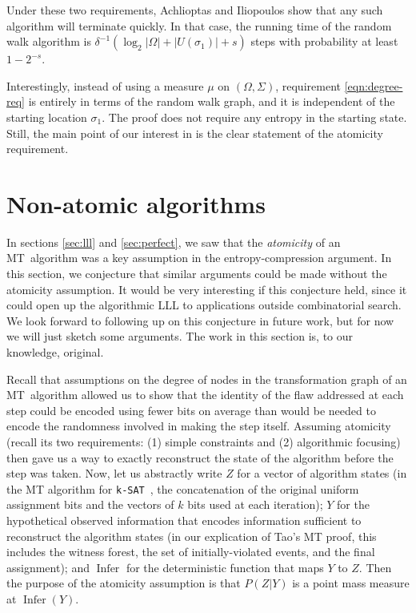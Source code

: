 \documentclass[twocolumn]{article}
\newcommand{\ksat}{\texttt{k-SAT}~}
\newcommand{\mt}{MT~}
\begin{document}
Under these two requirements, Achlioptas and Iliopoulos show that any such algorithm will terminate quickly.  In that case, the running time of the random walk algorithm is $\delta^{-1} (\log_2 |\Omega| + |U(\sigma_1)| + s)$ steps with probability at least $1 - 2^{-s}$.

Interestingly, instead of using a measure $\mu$ on $(\Omega, \Sigma)$, requirement \ref{eqn:degree-req} is entirely in terms of the random walk graph, and it is independent of the starting location $\sigma_1$.  The proof does not require any entropy in the starting state.  Still, the main point of our interest in \cite{achlioptas2014random} is the clear statement of the atomicity requirement.

\section{Non-atomic algorithms}
\label{sec:nonatomic}
In sections \ref{sec:lll} and \ref{sec:perfect}, we saw that the \emph{atomicity} of an \mt algorithm was a key assumption in the entropy-compression argument.  In this section, we conjecture that similar arguments could be made without the atomicity assumption.  It would be very interesting if this conjecture held, since it could open up the algorithmic LLL to applications outside combinatorial search.  We look forward to following up on this conjecture in future work, but for now we will just sketch some arguments.  The work in this section is, to our knowledge, original.

Recall that assumptions on the degree of nodes in the transformation graph of an \mt algorithm allowed us to show that the identity of the flaw addressed at each step could be encoded using fewer bits on average than would be needed to encode the randomness involved in making the step itself.  Assuming atomicity (recall its two requirements: (1) simple constraints and (2) algorithmic focusing) then gave us a way to exactly reconstruct the state of the algorithm before the step was taken.  Now, let us abstractly write $Z$ for a vector of algorithm states (in the MT algorithm for \ksat, the concatenation of the original uniform assignment bits and the vectors of $k$ bits used at each iteration); $Y$ for the hypothetical observed information that encodes information sufficient to reconstruct the algorithm states (in our explication of Tao's MT proof, this includes the witness forest, the set of initially-violated events, and the final assignment); and $\operatorname{Infer}$ for the deterministic function that maps $Y$ to $Z$.  Then the purpose of the atomicity assumption is that $P(Z | Y)$ is a point mass measure at $\operatorname{Infer}(Y)$.
\end{document}

